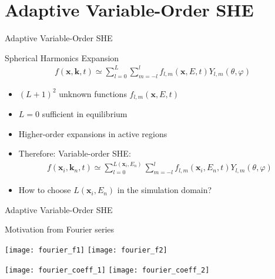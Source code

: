 
\section{Adaptive Variable-Order SHE}



\begin{frame}{Adaptive Variable-Order SHE}

  \vspace*{-0.05cm}
  \begin{block}{Spherical Harmonics Expansion}
     \vspace*{-0.6cm}
      { \begin{align*}
	f(\mathbf x, \mathbf k, t) \simeq \sum_{l = 0}^L \sum_{m=-l}^l f_{l,m}(\mathbf x, E, t) Y_{l,m}(\theta, \varphi)
      \end{align*}}
     \vspace*{-0.6cm}
  \end{block}

  \begin{itemize}
   \item $(L+1)^2$ unknown functions $f_{l,m}(\mathbf x, E, t)$
   \item $L=0$ sufficient in equilibrium
   \item Higher-order expansions in active regions
   \item Therefore: Variable-order SHE:
      { \Large \begin{align*}
	f(\mathbf x_i, \mathbf k_n, t) \simeq \sum_{l = 0}^{L(\mathbf x_i, E_n)} \sum_{m=-l}^l f_{l,m}(\mathbf x_i, E_n, t) Y_{l,m}(\theta, \varphi)
      \end{align*}}
   \item How to choose $L(\mathbf x_i, E_n)$ in the simulation domain?
  \end{itemize}
     \vspace*{0.92cm}
\end{frame}





\begin{frame}{Adaptive Variable-Order SHE}
  
 \begin{block}{Motivation from Fourier series}

  \vspace*{0.6cm}
  \begin{minipage}{0.97\textwidth}
    \texttt{[image: fourier\_f1]} \hspace*{0.25cm}
    \texttt{[image: fourier\_f2]} \hspace*{0.25cm} \newline

    \texttt{[image: fourier\_coeff\_1]}\hspace*{0.25cm}
    \texttt{[image: fourier\_coeff\_2]}
  \end{minipage}
 \end{block}

\end{frame}




